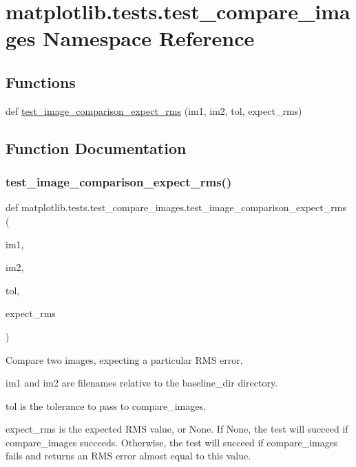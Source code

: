 \hypertarget{namespacematplotlib_1_1tests_1_1test__compare__images}{}\section{matplotlib.\+tests.\+test\+\_\+compare\+\_\+images Namespace Reference}
\label{namespacematplotlib_1_1tests_1_1test__compare__images}
\subsection*{Functions}
\begin{DoxyCompactItemize}
\item 
def \hyperlink{namespacematplotlib_1_1tests_1_1test__compare__images_a66dae3fe4d5bc28c6d6e02ff37308408}{test\+\_\+image\+\_\+comparison\+\_\+expect\+\_\+rms} (im1, im2, tol, expect\+\_\+rms)
\end{DoxyCompactItemize}


\subsection{Function Documentation}
\mbox{\label{namespacematplotlib_1_1tests_1_1test__compare__images_a66dae3fe4d5bc28c6d6e02ff37308408}} 
\subsubsection{\texorpdfstring{test\+\_\+image\+\_\+comparison\+\_\+expect\+\_\+rms()}{test\_image\_comparison\_expect\_rms()}}
{\footnotesize\ttfamily def matplotlib.\+tests.\+test\+\_\+compare\+\_\+images.\+test\+\_\+image\+\_\+comparison\+\_\+expect\+\_\+rms (\begin{DoxyParamCaption}\item[{}]{im1,  }\item[{}]{im2,  }\item[{}]{tol,  }\item[{}]{expect\+\_\+rms }\end{DoxyParamCaption})}

\begin{DoxyVerb}Compare two images, expecting a particular RMS error.

im1 and im2 are filenames relative to the baseline_dir directory.

tol is the tolerance to pass to compare_images.

expect_rms is the expected RMS value, or None. If None, the test will
succeed if compare_images succeeds. Otherwise, the test will succeed if
compare_images fails and returns an RMS error almost equal to this value.
\end{DoxyVerb}
 
